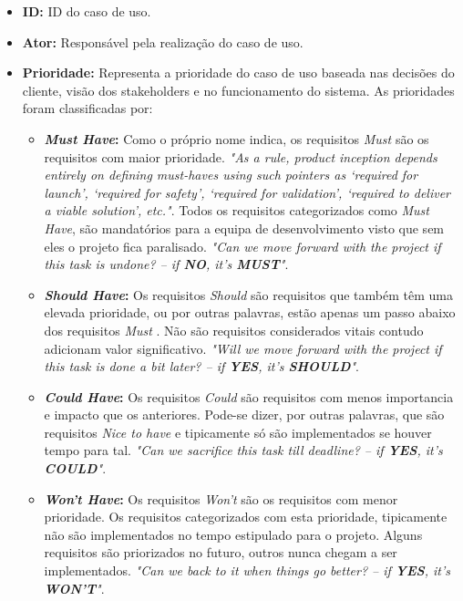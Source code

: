 \begin{itemize}
	\item \textbf{ID:} ID do caso de uso.
	\item \textbf{Ator:} Responsável pela realização do caso de uso.
	\item \textbf{Prioridade:} Representa a prioridade do caso de uso baseada nas decisões do cliente, visão dos stakeholders e no funcionamento do sistema. As prioridades foram classificadas por:
	\begin{itemize}
		\item \textbf{\textit{Must Have}:} Como o próprio nome indica, os requisitos \textit{Must} são os requisitos com maior prioridade. \textit{"As a rule, product inception depends entirely on defining must-haves using such pointers as ‘required for launch’, ‘required for safety’, ‘required for validation’, ‘required to deliver a viable solution’, etc."}\cite{moscow}. Todos os requisitos categorizados como \textit{Must Have}, são mandatórios para a equipa de desenvolvimento visto que sem eles o projeto fica paralisado.\textit{ "Can we move forward with the project if this task is undone? – if \textbf{NO}, it’s \textbf{MUST}"}\cite{moscow}.
		\item \textbf{\textit{Should Have}:} Os requisitos \textit{Should} são requisitos que também têm uma elevada prioridade, ou por outras palavras, estão apenas um passo abaixo dos requisitos \textit{Must} .
		Não são requisitos considerados vitais contudo adicionam valor significativo.\textit{ "Will we move forward with the project if this task is done a bit later? – if \textbf{YES}, it’s \textbf{SHOULD}"}\cite{moscow}.
		\item \textbf{\textit{Could Have}:} Os requisitos \textit{Could} são requisitos com menos importancia e impacto que os anteriores. Pode-se dizer, por outras palavras, que são requisitos \textit{Nice to have} e tipicamente só são implementados se houver tempo para tal. \textit{ "Can we sacrifice this task till deadline? – if \textbf{YES}, it’s \textbf{COULD}"}\cite{moscow}.
		\item \textbf{\textit{Won't Have}:} Os requisitos \textit{Won't} são os requisitos com menor prioridade. Os requisitos categorizados com esta prioridade, tipicamente não são implementados no tempo estipulado para o projeto. Alguns requisitos são priorizados no futuro, outros nunca chegam a ser implementados. \textit{ "Can we back to it when things go better? – if \textbf{YES}, it’s \textbf{WON’T}"}\cite{moscow}.
	\end{itemize}

\end{itemize}
